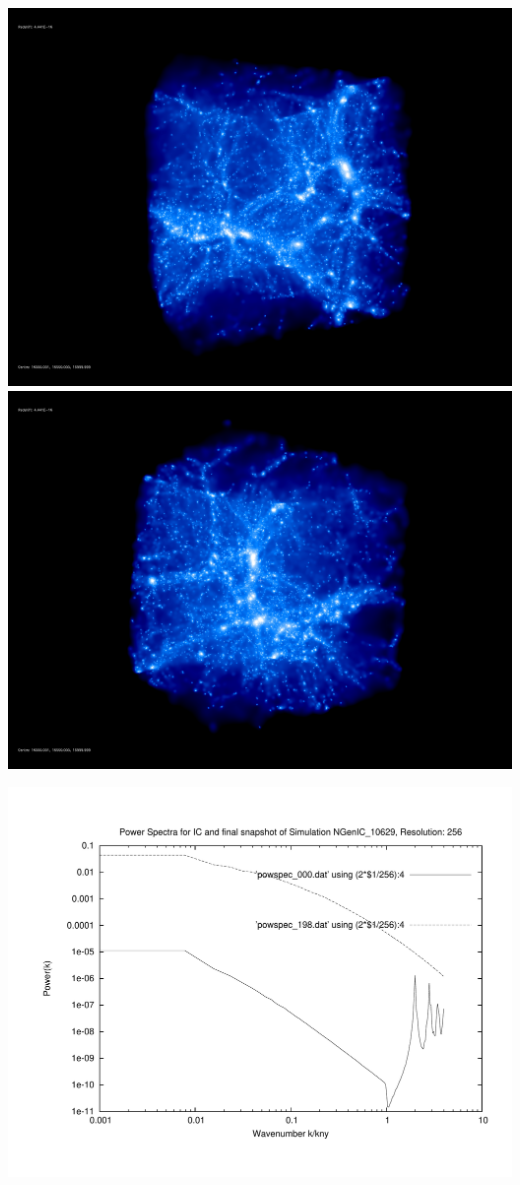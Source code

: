 \includegraphics[scale=0.1]{r256/NGenIC_10629/rotate_00074.jpg} 
\includegraphics[scale=0.1]{r256/NGenIC_10629/rotate_00131.jpg}

\includegraphics[scale=0.5]{r256/NGenIC_10629/plot_powspec_NGenIC_10629}

